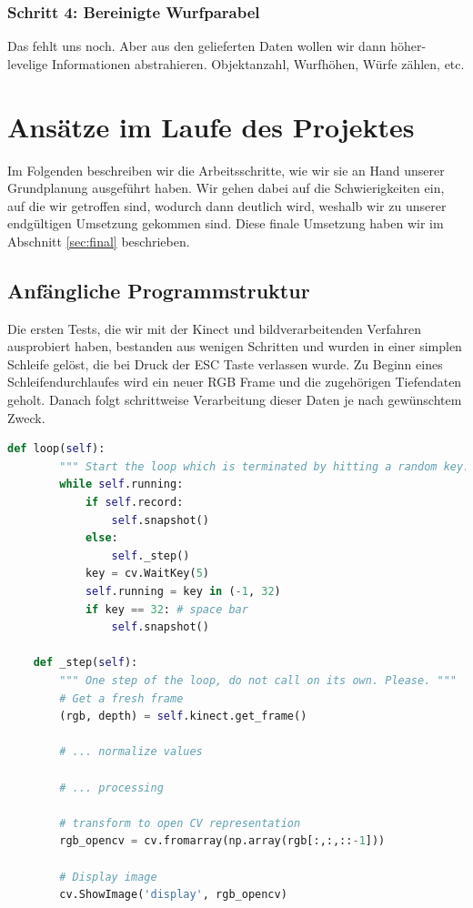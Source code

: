 \documentclass[12pt,a4paper,ngerman]{scrartcl}
\begin{document}
\subsubsection{Schritt 4: Bereinigte Wurfparabel}

Das fehlt uns noch. Aber aus den gelieferten Daten wollen wir dann höher-levelige Informationen abstrahieren. Objektanzahl, Wurfhöhen, Würfe zählen, etc.




\section{Ansätze im Laufe des Projektes}
\label{sec:ansaetze}

Im Folgenden beschreiben wir die Arbeitsschritte, wie wir sie an Hand unserer
Grundplanung ausgeführt haben. Wir gehen dabei auf die Schwierigkeiten ein, auf die
wir getroffen sind, wodurch dann deutlich wird, weshalb wir zu unserer endgültigen
Umsetzung gekommen sind. Diese finale Umsetzung haben wir im Abschnitt \ref{sec:final} beschrieben.

\subsection{Anfängliche Programmstruktur}

Die ersten Tests, die wir mit der Kinect und bildverarbeitenden Verfahren
ausprobiert haben, bestanden aus wenigen Schritten und wurden in einer
simplen Schleife gelöst, die bei Druck der ESC Taste verlassen wurde. Zu Beginn
eines Schleifendurchlaufes wird ein neuer RGB Frame und die zugehörigen
Tiefendaten geholt. Danach folgt schrittweise Verarbeitung dieser Daten je nach
gewünschtem Zweck.


\begin{lstlisting}[language=Python, caption={Jeder Schleifendurchlauf entspricht einem Frame. Mit der SPACE Taste wird der aktuelle Frame als Bild gespeichert, jede andere Taste beendet die Schleife und somit das Programm.}]
    def loop(self):
        """ Start the loop which is terminated by hitting a random key. """
        while self.running:
            if self.record:
                self.snapshot()
            else:
                self._step()
            key = cv.WaitKey(5)
            self.running = key in (-1, 32)
            if key == 32: # space bar
                self.snapshot()

    def _step(self):
        """ One step of the loop, do not call on its own. Please. """
        # Get a fresh frame
        (rgb, depth) = self.kinect.get_frame()

        # ... normalize values

        # ... processing

        # transform to open CV representation
        rgb_opencv = cv.fromarray(np.array(rgb[:,:,::-1]))

        # Display image
        cv.ShowImage('display', rgb_opencv)

\end{lstlisting}
\end{document}
